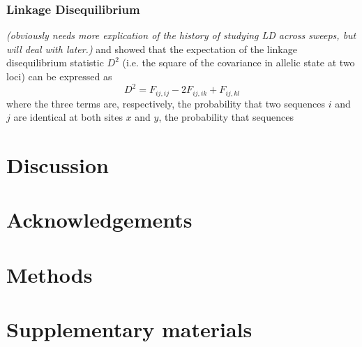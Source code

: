\documentclass[a4paper,10pt]{article}
\newcommand{\jb}[1]{{\it\color{blue} (#1)} }
\begin{document}
\subsubsection{Linkage Disequilibrium}
\jb{obviously needs more explication of the history of studying LD across sweeps, but will deal with later.}
\cite{StrobeckMorgan78} and \cite{Hudson85} showed that the expectation of the linkage disequilibrium statistic $D^2$ (i.e. the square of the covariance in allelic state at two loci) can be expressed as
\begin{equation}
	D^2 = F_{ij,ij} - 2F_{ij,ik} + F_{ij,kl}
\end{equation}
where the three terms are, respectively, the probability that two sequences $i$ and $j$ are identical at both sites $x$ and $y$, the probability that sequences 


\section{Discussion}


\section{Acknowledgements}

\section{Methods}





\section{Supplementary materials}

\setcounter{table}{0}
\renewcommand{\thetable}{S\arabic{table}}
\setcounter{figure}{0}
\renewcommand{\thefigure}{S\arabic{figure}}
\end{document}
